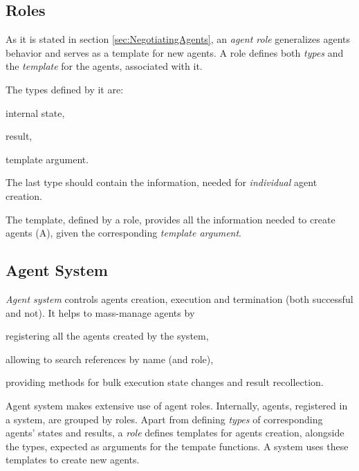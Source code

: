 \documentclass[../ThesisDoc]{subfiles}
\begin{document}
\subsection{Roles}

As it is stated in section \ref{sec:NegotiatingAgents}, an \emph{agent role}
generalizes agents behavior and serves as a template for new agents.
A role defines both \emph{types} and the \emph{template} for the agents, associated with it.

The types defined by it are:
  \begin{enumerate*}[1)]
    \item internal state,
    \item result,
    \item template argument.
  \end{enumerate*}
The last type should contain the information, needed for \emph{individual} agent creation.

The template, defined by a role, provides all the information needed to create agents (A),
given the corresponding \emph{template argument}.


\subsection{Agent System}

\emph{Agent system} controls agents creation, execution and termination
(both successful and not).
It helps to mass-manage agents by
\begin{enumerate*}[1)]
  \item registering all the agents created by the system,
  \item allowing to search references by name (and role),
  \item providing methods for bulk execution state changes and result recollection.
\end{enumerate*}


Agent system makes extensive use of agent roles. Internally, agents,
registered in a system, are grouped by roles.
Apart from defining \emph{types} of corresponding agents' states and results,
a \emph{role} defines templates for agents creation, alongside the types, expected
as arguments for the tempate functions.
A system uses these templates to create new agents.
\end{document}
